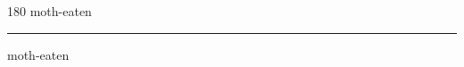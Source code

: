 
\begin{frame}
\begin{center}
\begin{turn}{180}
{\fontsize{2.5cm}{1em}\selectfont moth-eaten}
\end{turn}
\vspace{1em}\par  
\hrule
\vspace{1em}\par  
{\fontsize{2.5cm}{1em}\selectfont moth-eaten}
\end{center}
\end{frame}
